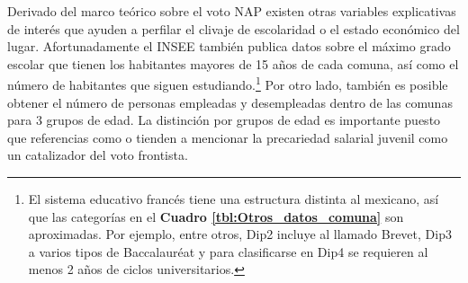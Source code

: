 Derivado del marco teórico sobre el voto NAP existen otras variables explicativas de interés que ayuden a perfilar el clivaje de escolaridad o el estado económico del lugar. Afortunadamente el INSEE también publica datos sobre el máximo grado escolar que tienen los habitantes mayores de 15 años de cada comuna, así como el número de habitantes que siguen estudiando.\footnote{El sistema educativo francés tiene una estructura distinta al mexicano, así que las categorías en el \textbf{Cuadro \ref{tbl:Otros_datos_comuna}} son aproximadas. Por ejemplo, entre otros, Dip2 incluye al llamado Brevet, Dip3 a varios tipos de Baccalauréat y para clasificarse en Dip4 se requieren al menos 2 años de ciclos universitarios.} Por otro lado, también es posible obtener el número de personas empleadas y desempleadas dentro de las comunas para 3 grupos de edad. La distinción por grupos de edad es importante puesto que referencias como \textcite{LeBras16} o \textcite{Perrineau07} tienden a mencionar la precariedad salarial juvenil como un catalizador del voto frontista.\\ 

\begin{table}[h]
\centering
{}
\caption{Otros datos a nivel comuna a utilizar en el análisis.}
\label{tbl:Otros_datos_comuna}
\end{table}

